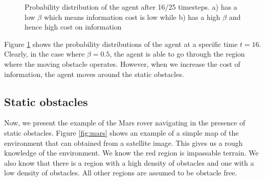 \begin{figure}
	\caption{Probability distribution of the agent after 16/25 timesteps. a) has a low $\beta$ which means information cost is low while b) has a high $\beta$ and hence high cost on information}
	\label{fig:expres}
\end{figure}

Figure \ref{fig:expres} shows the probability distributions of the agent at a specific time $t=16$. Clearly, in the case where $\beta=0.5$, the agent is able to go through the region where the moving obstacle operates. However, when we increase the cost of information, the agent moves around the static obstacles.

\subsection{Static obstacles}\label{sec:marsexp}
Now, we present the example of the Mars rover navigating in the presence of static obstacles. Figure \ref{fig:mars} shows an example of a simple map of the environment that can obtained from a satellite image. This gives us a rough knowledge of the environment. We know the red region is impassable terrain. We also know that there is a region with a high density of obstacles and one with a low density of obstacles. All other regions are assumed to be obstacle free.

